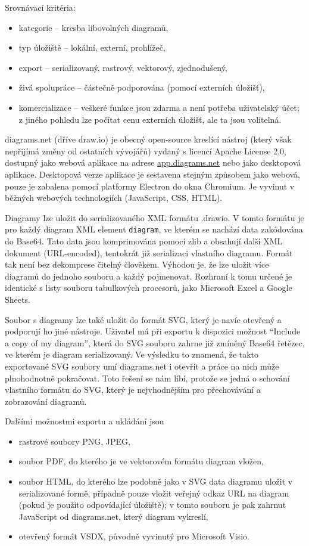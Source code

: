 Srovnávací kritéria:
\begin{itemize}
  \item kategorie -- kresba libovolných diagramů,
  \item typ úložiště -- lokální, externí, prohlížeč,
  \item export -- serializovaný, rastrový, vektorový, zjednodušený,
  \item živá spolupráce -- částečně podporována (pomocí externích úložišť),
  \item komercializace -- veškeré funkce jsou zdarma a není potřeba uživatelský
  účet; z jiného pohledu lze počítat cenu externích úložišť, ale ta jsou
  volitelná.
\end{itemize}

diagrams.net (dříve draw.io) je obecný open-source kreslící nástroj (který však
nepřijímá změny od ostatních vývojářů) vydaný s licencí Apache License 2.0,
dostupný jako webová aplikace na adrese \url{app.diagrams.net} nebo jako
desktopová aplikace. Desktopová verze aplikace je sestavena stejným způsobem
jako webová, pouze je zabalena pomocí platformy Electron do okna Chromium. Je
vyvinut v běžných we\-bo\-vých tech\-no\-lo\-gi\-ích (Java\-Script, CSS, HTML).

Diagramy lze uložit do serializovaného XML formátu .drawio. V tomto formátu je
pro každý diagram XML element \texttt{diagram}, ve kterém se nachází data
zakódována do Base64. Tato data jsou komprimována pomocí zlib a obsahují další
XML dokument (URL-encoded), tentokrát již serializaci vlastního diagramu. Formát
tak není bez dekomprese čitelný člověkem. Výhodou je, že lze uložit více
diagramů do jednoho souboru a každý pojmenovat. Rozhraní k tomu určené je
identické s listy souboru tabulkových procesorů, jako Microsoft Excel a Google
Sheets.

Soubor s diagramy lze také uložit do formát SVG, který je navíc otevřený a
podporují ho jiné nástroje. Uživatel má při exportu k dispozici možnost
``Include a copy of my diagram'', která do SVG souboru zahrne již zmíněný Base64
řetězec, ve kterém je diagram serializovaný. Ve výsledku to znamená, že takto
exportované SVG soubory umí diagrams.net i otevřít a práce na nich může
plnohodnotně pokračovat. Toto řešení se nám líbí, protože se jedná o schování
vlastního formátu do SVG, který je nejvhodnějším pro přechovávání a zobrazování
diagramů.

Dalšími možnostmi exportu a ukládání jsou
\begin{itemize}
  \item rastrové soubory PNG, JPEG,
  \item soubor PDF, do kterého je ve vektorovém formátu diagram vložen,
  \item soubor HTML, do kterého lze podobně jako v SVG data diagramu uložit v
  serializované formě, případně pouze vložit veřejný odkaz URL na diagram (pokud
  je použito odpovídající úložiště); v tomto souboru je pak zahrnut JavaScript
  od diagrams.net, který diagram vykreslí,
  \item otevřený formát VSDX, původně vyvinutý pro Microsoft Visio.
\end{itemize}

